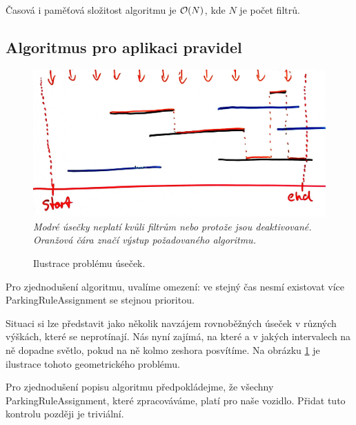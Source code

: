 Časová i paměťová složitost algoritmu je ${\cal O}(N)$, kde $N$ je počet filtrů.

\subsection{Algoritmus pro aplikaci pravidel}

\begin{figure}[!htb] \centering
  \includegraphics[width=145mm]{../img/rules_drawing.jpg}
  \textit{Modré úsečky neplatí kvůli filtrům nebo protože jsou deaktivované. Oranžová čára značí výstup požadovaného algoritmu.}
  \caption{Ilustrace problému úseček.}
  \label{fig:rules_drawing}
\end{figure}

\noindent
Pro zjednodušení algoritmu, uvalíme omezení: ve stejný čas nesmí existovat více ParkingRuleAssignment
se stejnou prioritou.

Situaci si lze představit jako několik navzájem rovnoběžných úseček v různých výškách, které se neprotínají.
Nás nyní zajímá, na které a v jakých intervalech na ně dopadne světlo, pokud na ně kolmo zeshora posvítíme.
Na obrázku \ref{fig:rules_drawing} je ilustrace tohoto geometrického problému.

Pro zjednodušení popisu algoritmu předpokládejme, že všechny ParkingRuleAssignment, které zpracováváme, platí pro naše vozidlo.
Přidat tuto kontrolu později je triviální.

